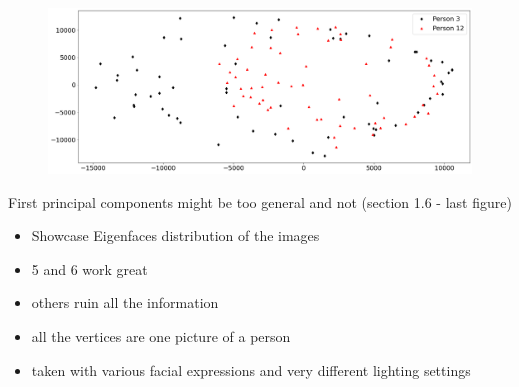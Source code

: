\begin{center}
    \begin{figure}[h]
      \centering
      \includegraphics[width=0.94\linewidth]{external_content/media/choice_of_pc/p3_12-pc1_2-centered.png}
      \captionsetup{justification=centering}
    \end{figure}
\end{center}

First principal components might be too general and not \cite{brunton2019data} (section 1.6 - last figure)

\begin{itemize}
	\item Showcase Eigenfaces distribution of the images
	\item 5 and 6 work great
	\item others ruin all the information
	\item all the vertices are one picture of a person
	\item taken with various facial expressions and very different lighting settings
\end{itemize}


\clearpage
